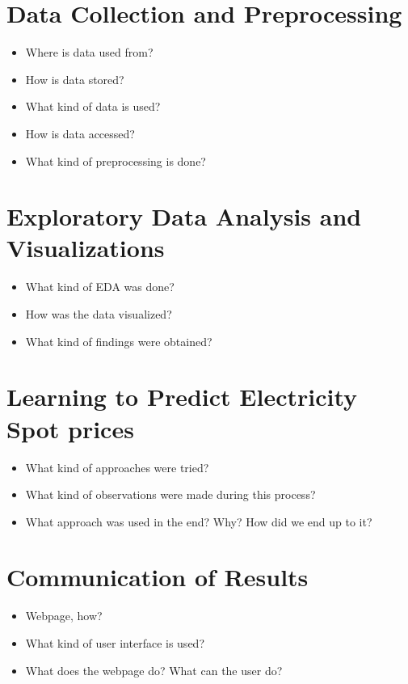 \documentclass{article}
\numberwithin{equation}{section}
\begin{document}
\section{Data Collection and Preprocessing}
\begin{itemize}
	\item Where is data used from?
	\item How is data stored?
	\item What kind of data is used?
	\item How is data accessed?
	\item What kind of preprocessing is done?
\end{itemize}

\section{Exploratory Data Analysis and Visualizations}
\begin{itemize}
	\item What kind of EDA was done?
	\item How was the data visualized?
	\item What kind of findings were obtained?
\end{itemize}

\section{Learning to Predict Electricity Spot prices}
\begin{itemize}
	\item What kind of approaches were tried?
	\item What kind of observations were made during this process?
	\item What approach was used in the end? Why? How did we end up to it?
\end{itemize}

\section{Communication of Results}
\begin{itemize}
	\item Webpage, how?
	\item What kind of user interface is used?
	\item What does the webpage do? What can the user do?
\end{itemize}
\end{document}
